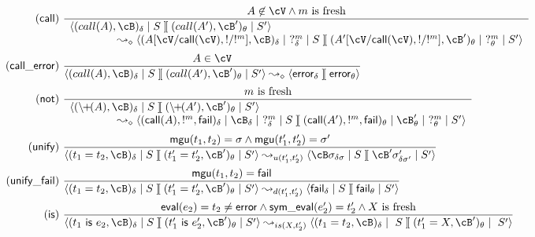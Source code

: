 \documentclass[fleqn]{tlp}
\newcommand{\mgu}{\mathsf{mgu}}
\newcommand{\error}{\mathsf{error}}
\newcommand{\sep}{\mathit{\;]\![\;}}
\def \tuple#1{\langle #1 \rangle}
\begin{document}
\begin{appendix}
\begin{figure}[b]
\[\begin{array}{r@{~}l}
    \mathsf{(call)} & {\displaystyle 
      \frac{A\not\in\cV\wedge m~\mbox{is fresh}} 
      {\begin{array}{l}
          \tuple{(call(A),\cB)_\delta\mid S
        \sep (call(A'),\cB')_\theta\mid S'} \\
          \hspace{10ex}\leadsto_\diamond
          \tuple{(A[\cV/\mathsf{call}(\cV),!/!^m],\cB)_{\delta}\mid ~?^m_{\delta}\mid S
          \sep (A'[\cV/\mathsf{call}(\cV),!/!^m],\cB')_{\theta}\mid ~?^m_{\theta}\mid S'}
      \end{array}}
        } \\[6ex]

    \mathsf{(call\_error)} & {\displaystyle 
      \frac{A\in\cV} 
        {\tuple{(call(A),\cB)_\delta\mid S \sep (call(A'),\cB')_\theta\mid S'}
          \leadsto_\diamond
          \tuple{\error_{\delta}\sep \error_{\theta}}}
        } \\[3ex]

    \mathsf{(not)} & {\displaystyle 
      \frac{m~\mbox{is fresh}} 
        {\begin{array}{l}
            \tuple{(\backslash\!\!+\!\!(A),\cB)_\delta\mid S
          \sep (\backslash\!\!+\!\!(A'),\cB')_\theta\mid S'} \\
          \hspace{10ex}\leadsto_\diamond
          \tuple{(\mathsf{call}(A),!^m,\mathsf{fail})_{\delta}\mid \cB_\delta\mid ~?^m_\delta\mid S
          \sep (\mathsf{call}(A'),!^m,\mathsf{fail})_{\theta}\mid \cB'_\theta\mid ~?^m_\theta\mid S'}
      \end{array}}
        } \\[6ex]

    \mathsf{(unify)} & {\displaystyle 
      \frac{\mgu(t_1,t_2)=\sigma \wedge \mgu(t'_1,t'_2)=\sigma'} 
        {\tuple{(t_1=t_2,\cB)_\delta\mid S\sep (t'_1=t'_2,\cB')_\theta\mid S'}
          \leadsto_{u(t'_1,t'_2)}
          \tuple{\cB\sigma_{\delta\sigma}\mid S\sep \cB'\sigma'_{\delta\sigma'}\mid S'}}
        } \\[3ex]

    \mathsf{(unify\_fail)} & {\displaystyle 
      \frac{\mgu(t_1,t_2)=\mathsf{fail}} 
        {\tuple{(t_1=t_2,\cB)_\delta\mid S\sep (t'_1=t'_2,\cB')_\theta\mid S'}
          \leadsto_{d(t'_1,t'_2)}
          \tuple{\mathsf{fail}_{\delta}\mid S\sep \mathsf{fail}_{\theta}\mid S'
          }}
        } \\[3ex]

    \mathsf{(is)} & {\displaystyle 
      \frac{\mathsf{eval}(e_2) = t_2 \neq \mathsf{error}
      \wedge \mathsf{sym\_eval}(e'_2) = t'_2\wedge \mbox{$X$ is fresh}} 
        {\tuple{(t_1~\mathsf{is}~e_2,\cB)_\delta\mid S
          \sep (t'_1~\mathsf{is}~e'_2,\cB')_\theta\mid S'}
          \leadsto_{is(X,t'_2)}
          \tuple{(t_1=t_2,\cB)_\delta\mid ~ S\sep
          (t'_1=X,\cB')_\theta\mid ~ S'}}
        } \\[3ex]


\end{array}\]
\end{figure}
\end{appendix}
\end{document}
